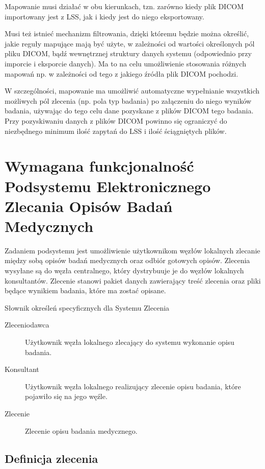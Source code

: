 \documentclass[a4paper]{report}
\begin{document}
Mapowanie musi działać w obu kierunkach, tzn. zarówno kiedy plik DICOM importowany jest z LSS, jak i kiedy jest do niego eksportowany.

Musi też istnieć mechanizm filtrowania, dzięki któremu będzie można określić, jakie reguły mapujące mają być użyte, w zależności od wartości określonych pól pliku DICOM, bądź wewnętrznej struktury danych systemu (odpowiednio przy imporcie i eksporcie danych). Ma to na celu umożliwienie stosowania różnych mapowań np. w zależności od tego z jakiego źródła plik DICOM pochodzi.

W szczególności, mapowanie ma umożliwić automatyczne wypełnianie wszystkich możliwych pól zlecenia (np. pola typ badania) po załączeniu do niego wyników badania, używając do tego celu dane pozyskane z plików DICOM tego badania. Przy pozyskiwaniu danych z plików DICOM powinno się ograniczyć do niezbędnego minimum ilość zapytań do LSS i ilość ściągniętych plików.

\chapter[Podsystem Elektronicznego Zlecania Opisów Badań]{Wymagana funkcjonalność Podsystemu Elektronicznego Zlecania Opisów Badań Medycznych}

Zadaniem podsystemu jest umożliwienie użytkownikom węzłów lokalnych zlecanie między sobą opisów
badań medycznych oraz odbiór gotowych opisów. Zlecenia wysyłane są do węzła centralnego, który
dystrybuuje je do węzłów lokalnych konsultantów. Zlecenie stanowi pakiet danych zawierający
treść zlecenia oraz pliki będące wynikiem badania, które ma zostać opisane. 

Słownik określeń specyficznych dla Systemu Zlecenia
\begin{description}
  \item[Zleceniodawca] Użytkownik węzła lokalnego zlecający do systemu wykonanie opisu badania.
  \item[Konsultant] Użytkownik węzła lokalnego realizujący zlecenie opisu badania, które pojawiło się na jego węźle.
  \item[Zlecenie] Zlecenie opisu badania medycznego.
\end{description}

\section{Definicja zlecenia}
\end{document}
